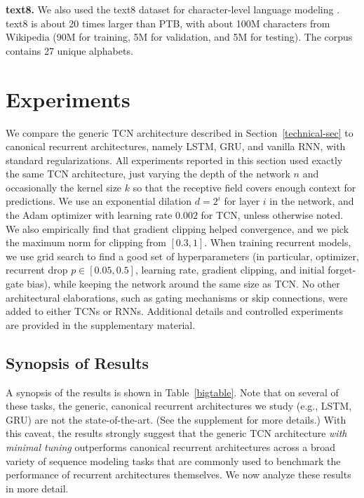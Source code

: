 \documentclass{article}
\newcommand\mypara[1]{\vspace{0mm}\noindent\textbf{#1}}
\begin{document}
\mypara{text8.} We also used the text8 dataset for character-level language
modeling \citep{mikolov2012subword}. text8 is about 20 times
larger than PTB, with about 100M characters from Wikipedia (90M for training, 5M
for validation, and 5M for testing). The corpus contains 27 unique alphabets.


\section{Experiments}
\label{experiments-sec}

We compare the generic TCN architecture described in Section~\ref{technical-sec}
to canonical recurrent architectures, namely LSTM, GRU, and vanilla RNN, with
standard regularizations. All experiments reported in this section used exactly
the same TCN architecture, just varying the depth of the network $n$ and occasionally
the kernel size $k$ so that the receptive field covers enough context for
predictions. We use an exponential dilation $d=2^i$ for layer $i$ in the network,
and the Adam optimizer \citep{kingma2014adam} with learning rate $0.002$ for TCN, unless
otherwise noted. We also empirically find that gradient clipping
helped convergence, and we pick the maximum norm for clipping from
$[0.3, 1]$. When training recurrent models, we use grid search to find a
good set of hyperparameters (in particular, optimizer, recurrent drop
$p \in [0.05, 0.5]$, learning rate, gradient clipping, and initial forget-gate
bias), while keeping the network around the same size as TCN. No other
architectural elaborations, such as gating mechanisms or skip connections,
were added to either TCNs or RNNs. Additional details and controlled experiments are
provided in the supplementary material.


\subsection{Synopsis of Results}

A synopsis of the results is shown in Table~\ref{bigtable}. Note that on several of
these tasks, the generic, canonical recurrent architectures we study (e.g., LSTM, GRU) are
not the state-of-the-art. (See the supplement for more details.) With this caveat, the results strongly
suggest that the generic TCN architecture \emph{with minimal tuning} outperforms canonical
recurrent architectures across a broad variety of sequence modeling tasks that are commonly
used to benchmark the performance of recurrent architectures themselves.
We now analyze these results in more detail.
\end{document}
